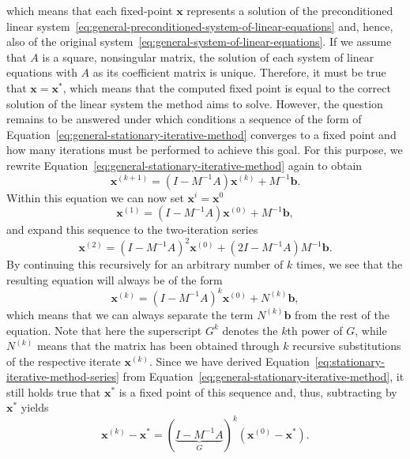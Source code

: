 which means that each fixed-point $\bm{x}$ represents a solution of the preconditioned linear system~\eqref{eq:general-preconditioned-system-of-linear-equations} and, hence, also of the original system~\eqref{eq:general-system-of-linear-equations}.
If we assume that $A$ is a square, nonsingular matrix, the solution of each system of linear equations with $A$ as its coefficient matrix is unique. 
Therefore, it must be true that $\bm{x} = \bm{x}^{*}$, which means that the computed fixed point is equal to the correct solution of the linear system the method aims to solve.
However, the question remains to be answered under which conditions a sequence of the form of Equation~\eqref{eq:general-stationary-iterative-method} converges to a fixed point and how many iterations must be performed to achieve this goal.
For this purpose, we rewrite Equation~\eqref{eq:general-stationary-iterative-method} again to obtain
\begin{equation}
	\bm{x}^{(k+1)} = (I - M^{-1} A) \bm{x}^{(k)} + M^{-1}\bm b.
\end{equation}
Within this equation we can now set $\bm{x}^{i} = \bm{x}^{0}$ 
\begin{equation}
	\bm{x}^{(1)} = (I - M^{-1} A) \bm{x}^{(0)} + M^{-1}\bm b,
\end{equation}
and expand this sequence to the two-iteration series
\begin{equation}
	\bm{x}^{(2)} = (I - M^{-1} A)^2 \bm{x}^{(0)} + (2I - M^{-1} A)M^{-1} \bm{b}.
\end{equation}
By continuing this recursively for an arbitrary number of $k$ times, we see that the resulting equation will always be of the form
\begin{equation}
	\bm{x}^{(k)} = (I - M^{-1} A)^k \bm{x}^{(0)} + N^{(k)}\bm{b},
	\label{eq:stationary-iterative-method-series}
\end{equation}
which means that we can always separate the term $N^{(k)}\bm{b}$ from the rest of the equation.
Note that here the superscript $G^k$ denotes the $k$th power of $G$, while $N^{(k)}$ means that the matrix has been obtained through $k$ recursive substitutions of the respective iterate $\bm{x}^{(k)}$.
Since we have derived Equation~\eqref{eq:stationary-iterative-method-series} from Equation~\eqref{eq:general-stationary-iterative-method}, it still holds true that $\bm{x}^{*}$ is a fixed point of this sequence and, thus, subtracting by $\bm{x}^{*}$ yields
\begin{equation}
	\bm{x}^{(k)} - \bm{x}^{*} = (\underbrace{I - M^{-1} A}_{G})^k (\bm{x}^{(0)} - \bm{x}^{*}).
	\label{eq:iteration-matrix-sequence}
\end{equation}
